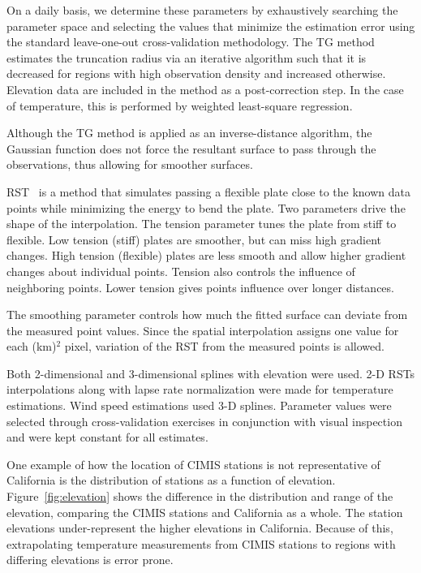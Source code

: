\documentclass[reviewcopy]{elsart}
\begin{document}
On a daily basis, we determine these parameters by exhaustively
searching the parameter space and selecting the values that minimize
the estimation error using the standard leave-one-out cross-validation
methodology.  The \ac{TG} method estimates the truncation radius via
an iterative algorithm such that it is decreased for regions with high
observation density and increased otherwise.  Elevation data are
included in the method as a post-correction step. In the case of
temperature, this is performed by weighted least-square regression.

Although the \ac{TG} method is applied as an inverse-distance algorithm,
the Gaussian function does not force the resultant surface to pass
through the observations, thus allowing for smoother surfaces.

\ac{RST}~\citep{mitasova.ea:95:rstgrass,neteler04open-sourc-gis} is a
method that simulates passing a flexible plate close to the known data
points while minimizing the energy to bend the plate.  Two parameters
drive the shape of the interpolation.  The tension parameter tunes the
plate from stiff to flexible.  Low tension (stiff) plates are
smoother, but can miss high gradient changes.  High tension (flexible)
plates are less smooth and allow higher gradient changes about
individual points.  Tension also controls the influence of neighboring
points.  Lower tension gives points influence over longer distances.

The smoothing parameter controls how much the fitted surface can
deviate from the measured point values. Since the spatial
interpolation assigns one value for each (\unit[2]{km})$^2$ pixel,
variation of the \ac{RST} from the measured points is allowed.

Both 2-dimensional and 3-dimensional splines with elevation were used.
2-D \acp{RST} interpolations along with lapse rate normalization were
made for temperature estimations.  Wind speed estimations used 3-D
splines. Parameter values were selected through cross-validation
exercises in conjunction with visual inspection and were kept constant
for all estimates.

One example of how the location of \ac{CIMIS} stations is not
representative of California is the distribution of stations as a
function of elevation.  Figure~\ref{fig:elevation} shows the
difference in the distribution and range of the elevation, comparing
the \ac{CIMIS} stations and California as a whole.  The station
elevations under-represent the higher elevations in California.
Because of this, extrapolating temperature measurements from CIMIS
stations to regions with differing elevations is error prone.
\end{document}
